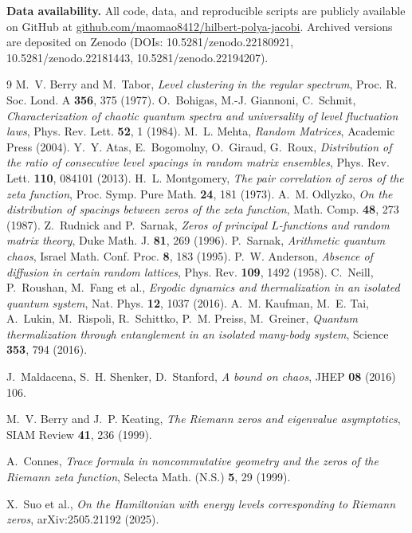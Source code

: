 \documentclass[aps,prx,reprint,floatfix]{revtex4-2}
\begin{document}
\begin{widetext}
\textbf{Data availability.} All code, data, and reproducible scripts are
publicly available on GitHub at
\href{https://github.com/maomao8412/hilbert-polya-jacobi}{github.com/maomao8412/hilbert-polya-jacobi}.
Archived versions are deposited on Zenodo (DOIs: 10.5281/zenodo.22180921,
10.5281/zenodo.22181443, 10.5281/zenodo.22194207).
\end{widetext}

\begin{thebibliography}{9}
 M.~V. Berry and M.~Tabor,
\emph{Level clustering in the regular spectrum}, Proc. R. Soc. Lond. A
\textbf{356}, 375 (1977).
 O.~Bohigas, M.-J. Giannoni, C.~Schmit,
\emph{Characterization of chaotic quantum spectra and universality of level
fluctuation laws}, Phys. Rev. Lett. \textbf{52}, 1 (1984).
 M.~L. Mehta, \emph{Random Matrices}, Academic Press (2004).
 Y.~Y. Atas, E.~Bogomolny, O.~Giraud, G.~Roux,
\emph{Distribution of the ratio of consecutive level spacings in random
matrix ensembles}, Phys. Rev. Lett. \textbf{110}, 084101 (2013).
 H.~L. Montgomery, \emph{The pair correlation of
zeros of the zeta function}, Proc. Symp. Pure Math. \textbf{24}, 181
(1973).
 A.~M. Odlyzko, \emph{On the distribution of spacings
between zeros of the zeta function}, Math. Comp. \textbf{48}, 273 (1987).
 Z.~Rudnick and P.~Sarnak, \emph{Zeros of principal
$L$-functions and random matrix theory}, Duke Math. J. \textbf{81}, 269
(1996).
 P.~Sarnak, \emph{Arithmetic quantum chaos}, Israel
Math. Conf. Proc. \textbf{8}, 183 (1995).
 P.~W. Anderson, \emph{Absence of diffusion in certain
random lattices}, Phys. Rev. \textbf{109}, 1492 (1958).
 C.~Neill, P.~Roushan, M.~Fang et al.,
\emph{Ergodic dynamics and thermalization in an isolated quantum system},
Nat. Phys. \textbf{12}, 1037 (2016).
 A.~M. Kaufman, M.~E. Tai, A.~Lukin, M.~Rispoli,
R.~Schittko, P.~M. Preiss, M.~Greiner, \emph{Quantum thermalization through
entanglement in an isolated many-body system}, Science \textbf{353}, 794
(2016).

 J.~Maldacena, S.~H. Shenker, D.~Stanford,
  \emph{A bound on chaos}, JHEP \textbf{08} (2016) 106.

 M.~V. Berry and J.~P. Keating,
  \emph{The Riemann zeros and eigenvalue asymptotics}, SIAM Review \textbf{41}, 236 (1999).

 A.~Connes,
  \emph{Trace formula in noncommutative geometry and the zeros of the Riemann zeta function},
  Selecta Math. (N.S.) \textbf{5}, 29 (1999).

 X.~Suo et al.,
  \emph{On the Hamiltonian with energy levels corresponding to Riemann zeros},
  arXiv:2505.21192 (2025).

\end{thebibliography}
\end{document}
